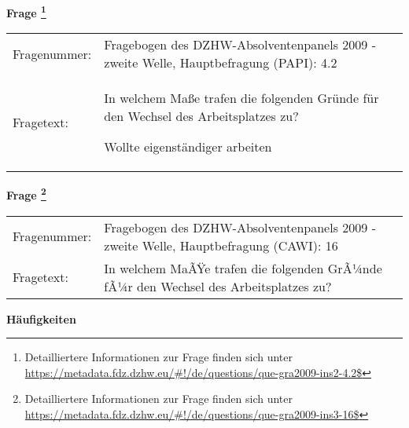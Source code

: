 				\vspace*{0.5cm}
                \noindent\textbf{Frage
	                \footnote{Detailliertere Informationen zur Frage finden sich unter
		              \url{https://metadata.fdz.dzhw.eu/\#!/de/questions/que-gra2009-ins2-4.2$}}}\\
				\begin{tabularx}{\hsize}{@{}lX}
					Fragenummer: &
					  Fragebogen des DZHW-Absolventenpanels 2009 - zweite Welle, Hauptbefragung (PAPI):
					  4.2
 \\
					Fragetext: & In welchem Maße trafen die folgenden Gründe für den Wechsel des Arbeitsplatzes zu?\par  Wollte eigenständiger arbeiten \\
				\end{tabularx}
				\vspace*{0.5cm}
                \noindent\textbf{Frage
	                \footnote{Detailliertere Informationen zur Frage finden sich unter
		              \url{https://metadata.fdz.dzhw.eu/\#!/de/questions/que-gra2009-ins3-16$}}}\\
				\begin{tabularx}{\hsize}{@{}lX}
					Fragenummer: &
					  Fragebogen des DZHW-Absolventenpanels 2009 - zweite Welle, Hauptbefragung (CAWI):
					  16
 \\
					Fragetext: & In welchem MaÃŸe trafen die folgenden GrÃ¼nde fÃ¼r den Wechsel des Arbeitsplatzes zu? \\
				\end{tabularx}





        		\vspace*{0.5cm}
                \noindent\textbf{Häufigkeiten}

